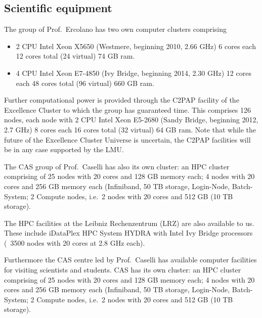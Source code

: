 \documentclass[10pt,fleqn,twoside]{article}
\begin{document}
\subsection{Scientific equipment}



The group of Prof.\ Ercolano has two own computer clusters comprising 

\begin{itemize}
\item 2 CPU Intel Xeon X5650 (Westmere, beginning
2010, 2.66 GHz) 6 cores each 12 cores total (24 virtual) 74 GB ram.

\item 4 CPU Intel Xeon E7-4850 (Ivy Bridge, beginning 2014, 2.30 GHz)
12 cores each 48 cores total (96 virtual) 660 GB ram.

\end{itemize}

Further computational power is provided through the C2PAP facility of the Excellence Cluster to which
the group has guaranteed time. This comprises 126 nodes, each node with 2 CPU Intel Xeon E5-2680 (Sandy
Bridge, beginning 2012, 2.7 GHz) 8 cores each 16 cores total (32
virtual) 64 GB ram. Note that while the future of the Excellence
Cluster Universe is uncertain, the C2PAP facilities will be in any
case supported by the LMU. 

The CAS group of Prof.\ Caselli has also its own cluster: an HPC
cluster comprising of 25 nodes with 20 cores and 128 GB memory each; 4
nodes with 20 cores and 256 GB memory each (Infiniband, 50 TB storage,
Login-Node, Batch-System; 2 Compute nodes, i.e.\ 2 nodes with 20 cores
and 512 GB (10 TB storage).  

The HPC facilities at the Leibniz Rechenzentrum (LRZ) are also
available to us. These include iDataPlex HPC System HYDRA with Intel
Ivy Bridge processors (~3500 nodes with 20 cores at 2.8 GHz each). 

Furthermore the CAS centre led by Prof.\ Caselli has available computer
facilities for visiting scientists and students. CAS has its own
cluster: an HPC cluster comprising of 25 nodes with 20 cores and 128
GB memory each; 4 nodes with 20 cores and 256 GB memory each
(Infiniband, 50 TB storage, Login-Node, Batch-System; 2 Compute nodes,
i.e.\ 2 nodes with 20 cores and 512 GB (10 TB storage).  


% 
% 
% 
% 
\end{document}
